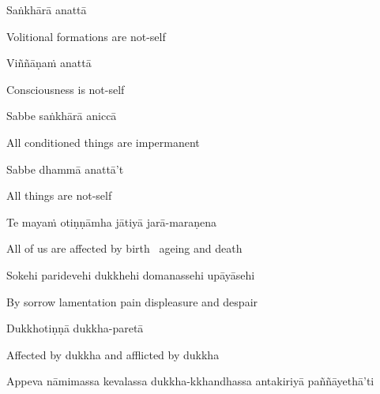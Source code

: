 Saṅkhārā anattā

\begin{cprenglish}
  Volitional formations are not-self
\end{cprenglish}

Viññāṇaṁ anattā

\begin{cprenglish}
  Consciousness is not-self
\end{cprenglish}

Sabbe saṅkhārā aniccā

\begin{cprenglish}
  All conditioned things are impermanent
\end{cprenglish}

Sabbe dhammā anattā't

\begin{cprenglish}
  All things are not-self
\end{cprenglish}

Te mayaṁ otiṇṇāmha jātiyā jarā-maraṇena

\begin{cprenglish}
  All of us are affected by birth \breathmark\ ageing and death
\end{cprenglish}

Sokehi paridevehi dukkhehi domanassehi upāyāsehi

\begin{cprenglish}
  By sorrow lamentation pain displeasure
  and despair
\end{cprenglish}

Dukkhotiṇṇā dukkha-paretā

\begin{cprenglish}
  Affected by dukkha and afflicted by dukkha
\end{cprenglish}

Appeva nāmimassa kevalassa dukkha-kkhandhassa antakiriyā paññāyethā'ti

